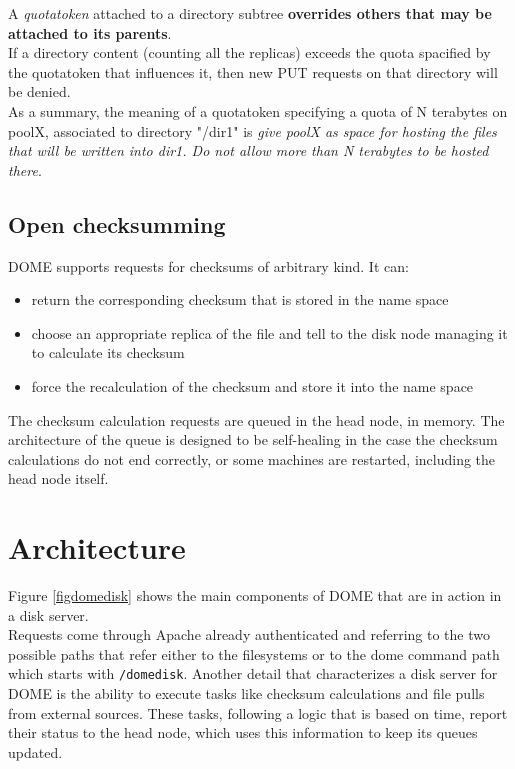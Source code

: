 \documentclass[a4paper]{jpconf}
\begin{document}
A \textit{quotatoken} attached to a directory subtree \textbf{overrides others that may be attached to its parents}.\\
If a directory content (counting all the replicas) exceeds the quota spacified by the quotatoken that influences it,
then new PUT requests on that directory will be denied.\\

As a summary, the meaning of a quotatoken specifying a quota of N terabytes on poolX, associated to directory "/dir1" is \textit{give poolX as
space for hosting the files that will be written into \/dir1. Do not allow more than N terabytes to be hosted there}.\\

\subsection{Open checksumming}
DOME supports requests for checksums of arbitrary kind. It can:\\

\begin{itemize}
 \item return the corresponding checksum that is stored in the name space
 \item choose an appropriate replica of the file and tell to the disk node managing it to calculate its checksum
 \item force the recalculation of the checksum and store it into the name space
\end{itemize}

The checksum calculation requests are queued in the head node, in memory. The architecture of the queue
is designed to be self-healing in the case the checksum calculations do not end correctly, or some machines are restarted,
including the head node itself.


\section{Architecture}
Figure \ref{figdomedisk} shows the main components of DOME that are in action in a disk server.\\
Requests come through Apache already authenticated and referring to the two possible paths that
refer either to the filesystems or to the dome command path which starts with \lstinline{/domedisk}.
Another detail that characterizes a disk server for DOME is the ability to execute tasks like checksum calculations
and file pulls from external sources. These tasks, following a logic that is based on time, report their status
to the head node, which uses this information to keep its queues updated.\\
 
\end{document}
